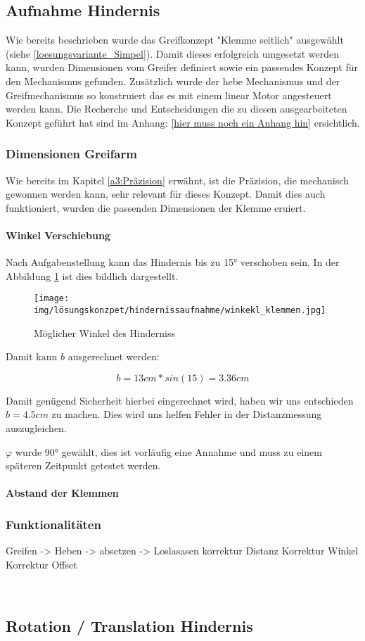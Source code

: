 \documentclass[../main.tex]{subfiles}
\begin{document}
\newpage
\subsection{Aufnahme Hindernis}
Wie bereits beschrieben wurde das Greifkonzept "Klemme seitlich" ausgewählt (siehe \ref{loesungsvariante_Simpel}).
Damit dieses erfolgreich umgesetzt werden kann, wurden Dimensionen vom Greifer definiert  sowie ein passendes Konzept für den Mechanismus gefunden. Zusätzlich wurde der hebe Mechanismus und der Greifmechanismus so konstruiert das es mit einem linear Motor angesteuert werden kann.
Die Recherche und Entscheidungen die zu diesen ausgearbeiteten Konzept geführt hat sind im Anhang: \ref{hier muss noch ein Anhang hin} ersichtlich.


\subsubsection{Dimensionen Greifarm}
Wie bereits im Kapitel \ref{a3:Präzision} erwähnt, ist die Präzision, die mechanisch gewonnen werden kann, sehr relevant für dieses Konzept. Damit dies auch funktioniert, wurden die passenden Dimensionen der Klemme eruiert. 

\paragraph{Winkel Verschiebung}
Nach Aufgabenstellung kann das Hindernis bis zu 15° verschoben sein.
In der Abbildung \ref{img:loes_winkel_hinderniss} ist dies bildlich dargestellt.

\begin{figure}[H]
        \centering
        \texttt{[image: img/lösungskonzpet/hindernissaufnahme/winkekl\_klemmen.jpg]}
        \caption[Möglicher Winkel des Hinderniss]{Möglicher Winkel des Hinderniss \footnotemark} 
        \label{img:loes_winkel_hinderniss}
\end{figure}

Damit kann $b$ ausgerechnet werden:

\[
b = 13cm * sin(15) = 3.36cm
\]

Damit genügend Sicherheit hierbei eingerechnet wird, haben wir uns entschieden $b = 4.5cm$ zu machen. Dies wird uns helfen Fehler in der Distanzmessung auszugleichen.

$\varphi$ wurde 90° gewählt, dies ist vorläufig eine Annahme und muss zu einem späteren Zeitpunkt getestet werden.

\paragraph{Abstand der Klemmen}


\newpage
\subsubsection{Funktionalitäten}
Greifen -> Heben -> absetzen -> Loslasasen
korrektur Distanz
Korrektur Winkel
Korrektur Offset

\


\subsection{Rotation / Translation Hindernis}
\end{document}
